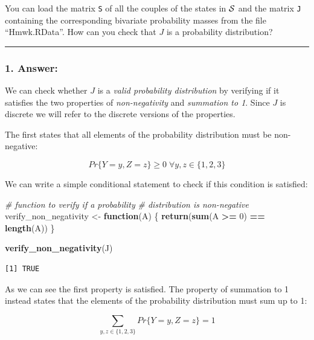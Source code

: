 \documentclass[
]{article}
\newenvironment{Shaded}{\begin{snugshade}}{\end{snugshade}}
\newcommand{\CommentTok}[1]{\textcolor[rgb]{0.56,0.35,0.01}{\textit{#1}}}
\newcommand{\ControlFlowTok}[1]{\textcolor[rgb]{0.13,0.29,0.53}{\textbf{#1}}}
\newcommand{\DecValTok}[1]{\textcolor[rgb]{0.00,0.00,0.81}{#1}}
\newcommand{\FunctionTok}[1]{\textcolor[rgb]{0.13,0.29,0.53}{\textbf{#1}}}
\newcommand{\NormalTok}[1]{#1}
\newcommand{\OtherTok}[1]{\textcolor[rgb]{0.56,0.35,0.01}{#1}}
\newcommand{\SpecialCharTok}[1]{\textcolor[rgb]{0.81,0.36,0.00}{\textbf{#1}}}
\begin{document}
You can load the matrix \texttt{S} of all the couples of the states in
\({\cal S}\) and the matrix \texttt{J} containing the corresponding
bivariate probability masses from the file ``Hmwk.RData''. How can you
check that \(J\) is a probability distribution?

\begin{center}\rule{0.5\linewidth}{0.5pt}\end{center}

\hypertarget{answer}{%
\subsubsection{1. Answer:}\label{answer}}

We can check whether \(J\) is a \emph{valid probability distribution} by
verifying if it satisfies the two properties of \emph{non-negativity}
and \emph{summation to 1}. Since \(J\) is discrete we will refer to the
discrete versions of the properties.

The first states that all elements of the probability distribution must
be non-negative:

\[
Pr \{Y=y,Z=z\} \ge 0 \; \forall y,z \in \{1, 2, 3\}
\]

We can write a simple conditional statement to check if this condition
is satisfied:

\begin{Shaded}
\begin{Highlighting}[]
\CommentTok{\# function to verify if a probability}
\CommentTok{\# distribution is non{-}negative}
\NormalTok{verify\_non\_negativity }\OtherTok{\textless{}{-}} \ControlFlowTok{function}\NormalTok{(A) \{}
    \FunctionTok{return}\NormalTok{(}\FunctionTok{sum}\NormalTok{(A }\SpecialCharTok{\textgreater{}=} \DecValTok{0}\NormalTok{) }\SpecialCharTok{==} \FunctionTok{length}\NormalTok{(A))}
\NormalTok{\}}

\FunctionTok{verify\_non\_negativity}\NormalTok{(J)}
\end{Highlighting}
\end{Shaded}

\begin{verbatim}
[1] TRUE
\end{verbatim}

As we can see the first property is satisfied. The property of summation
to 1 instead states that the elements of the probability distribution
must sum up to 1:

\[
\sum_{y,z \in \{ 1,2,3 \} } Pr \{ Y=y, Z=z \} = 1
\]
\end{document}

